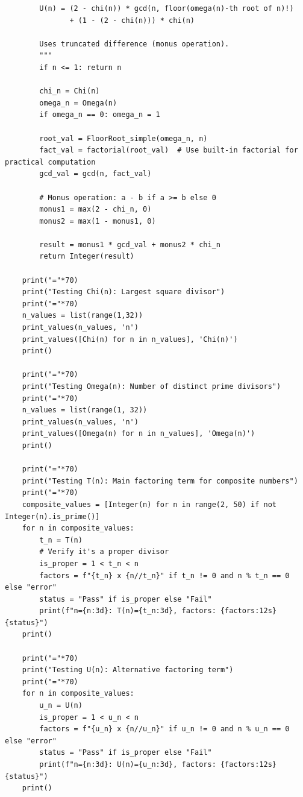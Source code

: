 \documentclass[10pt]{article}
\theoremstyle{plain}
\begin{document}
{\begin{verbatim}
        U(n) = (2 - chi(n)) * gcd(n, floor(omega(n)-th root of n)!)
               + (1 - (2 - chi(n))) * chi(n)
               
        Uses truncated difference (monus operation).
        """
        if n <= 1: return n
        
        chi_n = Chi(n)
        omega_n = Omega(n)
        if omega_n == 0: omega_n = 1
        
        root_val = FloorRoot_simple(omega_n, n)
        fact_val = factorial(root_val)  # Use built-in factorial for practical computation
        gcd_val = gcd(n, fact_val)
        
        # Monus operation: a - b if a >= b else 0
        monus1 = max(2 - chi_n, 0)
        monus2 = max(1 - monus1, 0)
        
        result = monus1 * gcd_val + monus2 * chi_n
        return Integer(result)
    
    print("="*70)
    print("Testing Chi(n): Largest square divisor")
    print("="*70)
    n_values = list(range(1,32))
    print_values(n_values, 'n')
    print_values([Chi(n) for n in n_values], 'Chi(n)')
    print()
    
    print("="*70)
    print("Testing Omega(n): Number of distinct prime divisors")
    print("="*70)
    n_values = list(range(1, 32))
    print_values(n_values, 'n')
    print_values([Omega(n) for n in n_values], 'Omega(n)')
    print()
    
    print("="*70)
    print("Testing T(n): Main factoring term for composite numbers")
    print("="*70)
    composite_values = [Integer(n) for n in range(2, 50) if not Integer(n).is_prime()]
    for n in composite_values:
        t_n = T(n)
        # Verify it's a proper divisor
        is_proper = 1 < t_n < n
        factors = f"{t_n} x {n//t_n}" if t_n != 0 and n % t_n == 0 else "error"
        status = "Pass" if is_proper else "Fail"
        print(f"n={n:3d}: T(n)={t_n:3d}, factors: {factors:12s} {status}")
    print()
    
    print("="*70)
    print("Testing U(n): Alternative factoring term")
    print("="*70)
    for n in composite_values:
        u_n = U(n)
        is_proper = 1 < u_n < n
        factors = f"{u_n} x {n//u_n}" if u_n != 0 and n % u_n == 0 else "error"
        status = "Pass" if is_proper else "Fail"
        print(f"n={n:3d}: U(n)={u_n:3d}, factors: {factors:12s} {status}")
    print()
\end{verbatim}
}

\end{document}
